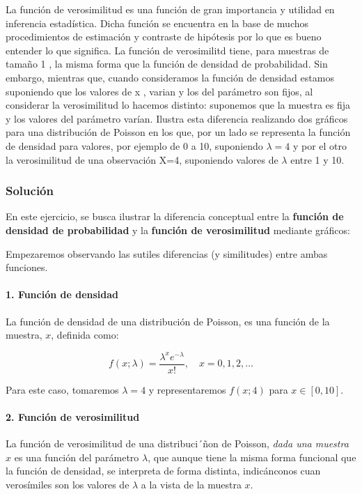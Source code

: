 \documentclass[
]{article}
\begin{document}
La función de verosimilitud es una función de gran importancia y utilidad en inferencia estadística. Dicha función se encuentra en la base de muchos procedimientos de estimación y contraste de hipótesis por lo que es bueno entender lo que significa. La función de verosimilitd tiene, para muestras de tamaño 1 , la misma forma que la función de densidad de probabilidad. Sin embargo, mientras que, cuando consideramos la función de densidad estamos suponiendo que los valores de x , varian y los del parámetro son fijos, al considerar la verosimilitud lo hacemos distinto: suponemos que la muestra es fija y los valores del parámetro varían. Ilustra esta diferencia realizando dos gráficos para una distribución de Poisson en los que, por un lado se representa la función de densidad para valores, por ejemplo de 0 a 10, suponiendo \(\lambda=4\) y por el otro la verosimilitud de una observación X=4, suponiendo valores de \(\lambda\) entre 1 y 10.

\subsubsection{Solución}\label{soluciuxf3n-13}

En este ejercicio, se busca ilustrar la diferencia conceptual entre la \textbf{función de densidad de probabilidad} y la \textbf{función de verosimilitud} mediante gráficos:

Empezaremos observando las sutiles diferencias (y similitudes) entre ambas funciones.

\paragraph{1. Función de densidad}\label{funciuxf3n-de-densidad}

La función de densidad de una distribución de Poisson, es una función de la muestra, \(x\), definida como:

\[
f(x; \lambda) = \frac{\lambda^x e^{-\lambda}}{x!}, \quad x = 0, 1, 2, \ldots
\]

Para este caso, tomaremos \(\lambda = 4\) y representaremos \(f(x; 4)\) para \(x \in [0, 10]\).

\paragraph{2. Función de verosimilitud}\label{funciuxf3n-de-verosimilitud}

La función de verosimilitud de una distribuci´ñon de Poisson, \emph{dada una muestra \(x\)} es una función del parámetro \(\lambda\), que aunque tiene la misma forma funcional que la función de densidad, se interpreta de forma distinta, indicánconos cuan verosímiles son los valores de \(\lambda\) a la vista de la muestra \(x\).
\end{document}

